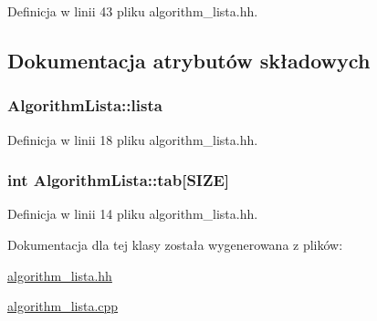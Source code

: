 Definicja w linii 43 pliku algorithm\-\_\-lista.\-hh.



\subsection{Dokumentacja atrybutów składowych}
\hypertarget{class_algorithm_lista_a5c4c8b55e6d71eae06c98cd39f38bb30}{
\subsubsection[{lista}]{ Algorithm\-Lista\-::lista\hspace{0.3cm}{\ttfamily [private]}}}\label{class_algorithm_lista_a5c4c8b55e6d71eae06c98cd39f38bb30}


Definicja w linii 18 pliku algorithm\-\_\-lista.\-hh.

\hypertarget{class_algorithm_lista_ad04d74953d75c8886b0c5cfda71773f7}{
\subsubsection[{tab}]{\setlength{\rightskip}{0pt plus 5cm}int Algorithm\-Lista\-::tab\mbox{[}{\bf S\-I\-Z\-E}\mbox{]}\hspace{0.3cm}{\ttfamily [private]}}}\label{class_algorithm_lista_ad04d74953d75c8886b0c5cfda71773f7}


Definicja w linii 14 pliku algorithm\-\_\-lista.\-hh.



Dokumentacja dla tej klasy została wygenerowana z plików\-:\begin{DoxyCompactItemize}
\item 
\hyperlink{algorithm__lista_8hh}{algorithm\-\_\-lista.\-hh}\item 
\hyperlink{algorithm__lista_8cpp}{algorithm\-\_\-lista.\-cpp}\end{DoxyCompactItemize}
